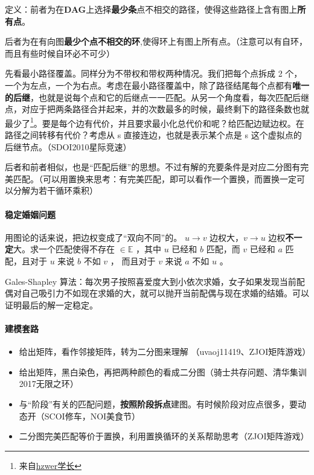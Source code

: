 \documentclass[]{ctexart}
\let\oldparagraph\paragraph
\renewcommand{\paragraph}[1]{\oldparagraph{#1}\mbox{}}
\begin{document}
定义：前者为在\textbf{DAG}上选择\textbf{最少条}点不相交的路径，使得这些路径上含有图上\textbf{所有点}。

后者为在有向图\textbf{最少个点不相交的环},使得环上有图上所有点。（注意可以有自环，而且有些时候自环必不可少）

先看最小路径覆盖。同样分为不带权和带权两种情况。我们把每个点拆成 2
个，一个为左点，一个为右点。考虑在最小路径覆盖中，除了路径结尾每个点都有\textbf{唯一的后继}，也就是说每个点和它的后继点一一匹配。从另一个角度看，每次匹配后继点，对应于把两条路径合并起来，并的次数最多的时候，最终剩下的路径条数也就最少了\footnote{来自\href{http://hzwer.com/1758.html}{hzwer学长}}。要是每个边有代价，并且要求最小化总代价和呢？给匹配边赋边权。在路径之间转移有代价？考虑从
s 直接连边，也就是表示某个点是 s
这个虚拟点的后继节点。（SDOI2010星际竞速）

后者和前者相似，也是``匹配后继''的思想。不过有解的充要条件是对应二分图有完美匹配。（可以用置换来思考：有完美匹配，即可以看作一个置换，而置换一定可以分解为若干循环乘积）

\hypertarget{header-n440}{%
\paragraph{稳定婚姻问题}\label{header-n440}}

用图论的话来说，把边权变成了``双向不同''的。 \(u \rightarrow v\)
边权大，\( v \rightarrow u\) 边权\textbf{不一定}大。求一个匹配使得不存在
\(<u,v> \in \mathbb{E}\) ，其中 \(u\) 已经和 \(b\) 匹配，而 \(v\) 已经和
\(a\) 匹配，且对于 \(u\) 来说 \(b\) 不如 \(v\) ， 而且对于 \(v\) 来说
\(a\) 不如 \(u\) 。

Gales-Shapley
算法：每次男子按照喜爱度大到小依次求婚，女子如果发现当前配偶对自己吸引力不如现在求婚的大，就可以抛开当前配偶与现在求婚的结婚。可以证明最后的解一定稳定。

\hypertarget{header-n445}{%
\paragraph{建模套路}\label{header-n445}}

\begin{itemize}
\item
  给出矩阵，看作邻接矩阵，转为二分图来理解 （uvaoj11419、ZJOI矩阵游戏）
\item
  给出矩阵，黑白染色，再把两种颜色的看成二分图（骑士共存问题、清华集训2017无限之环）
\item
  与``阶段''有关的匹配问题，\textbf{按照阶段拆点}建图。有时候阶段对应点很多，要动态开（SCOI修车，NOI美食节）
\item
  二分图完美匹配等价于置换，利用置换循环的关系帮助思考（ZJOI矩阵游戏）
\end{itemize}
\end{document}
